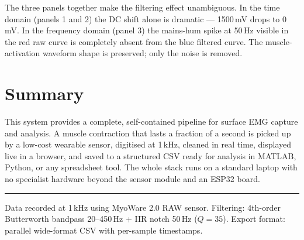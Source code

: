 \documentclass[11pt,a4paper]{article}
\begin{document}
The three panels together make the filtering effect unambiguous. In the time domain (panels 1 and 2) the DC shift alone is dramatic --- 1500\,mV drops to 0\,mV. In the frequency domain (panel 3) the mains-hum spike at 50\,Hz visible in the red raw curve is completely absent from the blue filtered curve. The muscle-activation waveform shape is preserved; only the noise is removed.

\section{Summary}

This system provides a complete, self-contained pipeline for surface EMG capture and analysis. A muscle contraction that lasts a fraction of a second is picked up by a low-cost wearable sensor, digitised at 1\,kHz, cleaned in real time, displayed live in a browser, and saved to a structured CSV ready for analysis in MATLAB, Python, or any spreadsheet tool. The whole stack runs on a standard laptop with no specialist hardware beyond the sensor module and an ESP32 board.

\noindent\rule{\textwidth}{0.4pt}
{\small\color{darkgray} Data recorded at 1\,kHz using MyoWare 2.0 RAW sensor. Filtering: 4th-order Butterworth bandpass 20--450\,Hz + IIR notch 50\,Hz ($Q=35$). Export format: parallel wide-format CSV with per-sample timestamps.}
\end{document}
